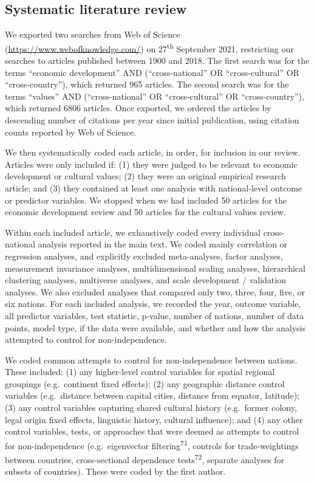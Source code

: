 \documentclass[english,man,floatsintext]{apa6}
\begin{document}
\hypertarget{systematic-literature-review}{%
\subsection{Systematic literature review}\label{systematic-literature-review}}

We exported two searches from Web of Science (\url{https://www.webofknowledge.com/}) on 27\textsuperscript{th} September 2021, restricting our searches to articles published between 1900 and 2018. The first search was for the terms \enquote{economic development} AND (\enquote{cross-national} OR \enquote{cross-cultural} OR \enquote{cross-country}), which returned 965 articles. The second search was for the terms \enquote{values} AND (\enquote{cross-national} OR \enquote{cross-cultural} OR \enquote{cross-country}), which returned 6806 articles. Once exported, we ordered the articles by descending number of citations per year since initial publication, using citation counts reported by Web of Science.

We then systematically coded each article, in order, for inclusion in our review. Articles were only included if: (1) they were judged to be relevant to economic development or cultural values; (2) they were an original empirical research article; and (3) they contained at least one analysis with national-level outcome or predictor variables. We stopped when we had included 50 articles for the economic development review and 50 articles for the cultural values review.

Within each included article, we exhaustively coded every individual cross-national analysis reported in the main text. We coded mainly correlation or regression analyses, and explicitly excluded meta-analyses, factor analyses, measurement invariance analyses, multidimensional scaling analyses, hierarchical clustering analyses, multiverse analyses, and scale development / validation analyses. We also excluded analyses that compared only two, three, four, five, or six nations. For each included analysis, we recorded the year, outcome variable, all predictor variables, test statistic, p-value, number of nations, number of data points, model type, if the data were available, and whether and how the analysis attempted to control for non-independence.

We coded common attempts to control for non-independence between nations. These included: (1) any higher-level control variables for spatial regional groupings (e.g.~continent fixed effects); (2) any geographic distance control variables (e.g.~distance between capital cities, distance from equator, latitude); (3) any control variables capturing shared cultural history (e.g.~former colony, legal origin fixed effects, linguistic history, cultural influence); and (4) any other control variables, tests, or approaches that were deemed as attempts to control for non-independence (e.g.~eigenvector filtering\textsuperscript{71}, controls for trade-weightings between countries, cross-sectional dependence tests\textsuperscript{72}, separate analyses for subsets of countries). These were coded by the first author.
\end{document}
